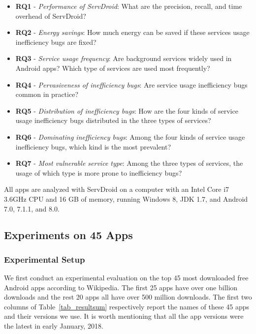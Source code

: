 \documentclass[sigconf,review, anonymous]{acmart}
\begin{document}
\begin{itemize}
\item {\bf RQ1} - {\it Performance of \textsf{ServDroid}}: What are the
precision, recall, and time overhead of \textsf{ServDroid}?
\item {\bf RQ2} - {\it Energy savings}: How much energy can be saved if these
services usage inefficiency bugs are fixed?
\item {\bf RQ3} - {\it Service usage frequency}: Are background services widely
used in Android apps? Which type of services are used most frequently?
\item {\bf RQ4} - {\it Pervasiveness of inefficiency bugs}: Are service usage inefficiency bugs common in practice?
\item {\bf RQ5} - {\it Distribution of inefficiency bugs}: How are the four kinds of service usage inefficiency bugs distributed in the three types of services?
\item {\bf RQ6} - {\it Dominating inefficiency bugs}: Among the four kinds of service usage inefficiency bugs, which kind is the most prevalent?
\item {\bf RQ7} - {\it Most vulnerable service type}: Among the three types of services, the usage of which type is more prone to inefficiency bugs?
\end{itemize}

All apps are analyzed with \textsf{ServDroid} on a computer with an Intel Core i7 3.6GHz CPU and 16 GB of memory, running Windows 8, JDK 1.7, and Android 7.0, 7.1.1, and 8.0.

\subsection{Experiments on 45 Apps}

\subsubsection{Experimental Setup}
We first conduct an experimental evaluation on the top 45 most
downloaded free Android apps according to Wikipedia. The first 25 apps have
over one billion downloads and the rest 20 apps all have over 500 million
downloads. The first two columns of Table~\ref{tab_resultsum} respectively
report the names of these 45 apps and their versions we use. It is worth
mentioning that all the app versions were the latest in early January, 2018.
\end{document}
